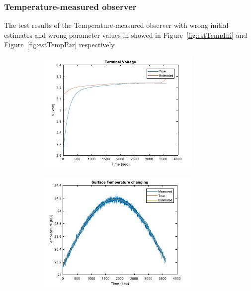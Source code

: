 \documentclass[12pt]{article}
\begin{document}
\subsubsection{Temperature-measured observer}
The test results of the Temperature-measured observer with wrong initial estimates and wrong parameter values in showed in Figure~\ref{fig:estTempIni} and Figure~\ref{fig:estTempPar} respectively.
\begin{figure}[H]
	\centering
	\begin{subfigure}[t]{0.3\linewidth}
		\includegraphics[width=\linewidth]{figures/estTempIni1.pdf}
	\end{subfigure}
	\begin{subfigure}[t]{0.3\linewidth}
		\includegraphics[width=\linewidth]{figures/estTempIni2.pdf}

\end{subfigure}
\end{figure}
\end{document}
